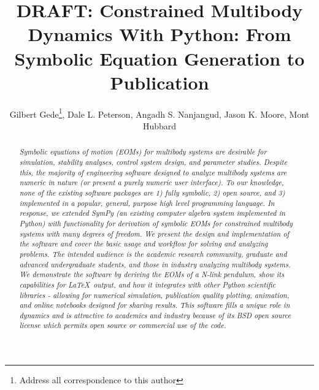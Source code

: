 \documentclass[twocolumn,10pt]{asme2e}
\title{DRAFT: Constrained Multibody Dynamics With Python: From Symbolic
Equation Generation to Publication}
\author{Gilbert Gede\thanks{Address all correspondence to this author}, Dale L.
Peterson, Angadh S. Nanjangud, Jason K. Moore, Mont Hubbard
  \affiliation{
    Sports Biomechanics Laboratory\\
    Department of Mechanical and Aerospace Engineering\\
    University of California\\
    Davis, California 95616\\
    Email: \{ggede, dlpeterson, asnanjangud, jkmoor, mhubbard\}@ucdavis.edu
  }
}
\begin{document}
\maketitle

\begin{abstract}
\it Symbolic equations of motion (EOMs) for multibody systems are desirable
for simulation, stability analyses, control system design, and parameter
studies.
Despite this, the majority of engineering software designed to analyze
multibody systems are numeric in nature (or present a purely numeric user
interface). To our knowledge, none of the existing software packages are 1)
fully symbolic, 2) open source, and 3) implemented in a popular, general,
purpose high level programming language.
In response, we extended SymPy (an existing computer algebra system implemented
in Python) with functionality for derivation of symbolic EOMs for constrained
multibody systems with many degrees of freedom.
We present the design and implementation of the software and cover the basic
usage and workflow for solving and analyzing problems. The intended audience is
the academic research community, graduate and advanced undergraduate students,
and those in industry analyzing multibody systems.
We demonstrate the software by deriving the EOMs of a N-link pendulum, show its
capabilities for \LaTeX\ output, and how it integrates with other Python
scientific libraries - allowing for numerical simulation, publication quality
plotting, animation, and online notebooks designed for sharing results.
This software fills a unique role in dynamics and is attractive to academics
and industry because of its BSD open source license which permits open source
or commercial use of the code.

\end{abstract}

\end{document}
